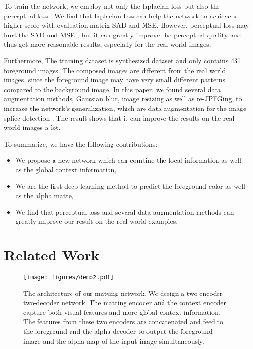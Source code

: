 \documentclass[10pt,twocolumn,letterpaper]{article}
\begin{document}
{To train the network, we employ not only the laplacian loss \cite{bojanowski2017optimizing, niklaus2018context} but also the perceptual loss \cite{dosovitskiy2016generating, dosovitskiy2016generating, sajjadi2017enhancenet, ledig2017photo, zhu2016generative, niklaus2017video, niklaus2018context}. We find that laplacian loss can help the network to achieve a higher score with evaluation matrix SAD and MSE. However, perceptual loss may hurt the SAD and MSE \cite{blau2018perception}, but it can greatly improve the perceptual quality and thus get more reasonable results, especially for the real world images. 

Furthermore, The training dataset\cite{xu2017deep} is synthesized dataset and only contains 431 foreground images. The composed images are different from the real world images, since the foreground image may have very small different patterns compared to the background image. In this paper, we found several data augmentation methods, Gaussian blur, image resizing as well as re-JPEGing, to increase the network's generalization, which are data augmentation for the image splice detection \cite{huh2018fighting}. The result shows that it can improve the results on the real world images a lot.





To summarize, we have the following contributions:
\begin{itemize}
    \item We propose a new network which can combine the local information as well as the global context information,
    \item We are the first deep learning method to predict the foreground color as well as the alpha matte,
    \item We find that perceptual loss and several data augmentation methods can greatly improve our result on the real world examples. 
\end{itemize}
} 

\section{Related Work}
\label{sec:related} 
\begin{figure*}[ht]
	\centering
	\texttt{[image: figures/demo2.pdf]}
	\caption{The architecture of our matting network. We design a two-encoder-two-decoder network. The matting encoder and the context encoder capture both visual features and more global context information. The features from these two encoders are concatenated and feed to the foreground and the alpha decoder to output the foreground image and the alpha map of the input image simultaneously.}\vspace{-0.1in}
	\label{fig:arch}
\end{figure*}
\end{document}
